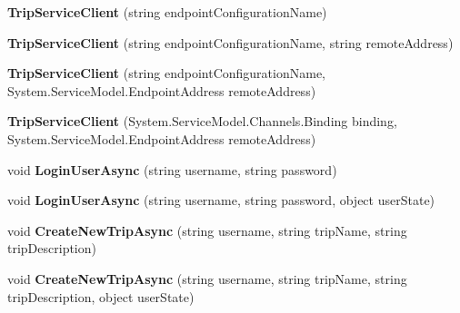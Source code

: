 \begin{DoxyCompactItemize}
\item 
\hypertarget{class_trip_service_client_a00bff7b4e57709fa66367f838cc62003}{
{\bfseries TripServiceClient} (string endpointConfigurationName)}
\label{class_trip_service_client_a00bff7b4e57709fa66367f838cc62003}

\item 
\hypertarget{class_trip_service_client_ab4a2663da378c9b53d77ae14cb527579}{
{\bfseries TripServiceClient} (string endpointConfigurationName, string remoteAddress)}
\label{class_trip_service_client_ab4a2663da378c9b53d77ae14cb527579}

\item 
\hypertarget{class_trip_service_client_a14810eca7652c4f20b773d6f6ee80b4b}{
{\bfseries TripServiceClient} (string endpointConfigurationName, System.ServiceModel.EndpointAddress remoteAddress)}
\label{class_trip_service_client_a14810eca7652c4f20b773d6f6ee80b4b}

\item 
\hypertarget{class_trip_service_client_a74f3aec249adc60fef595b722d37599c}{
{\bfseries TripServiceClient} (System.ServiceModel.Channels.Binding binding, System.ServiceModel.EndpointAddress remoteAddress)}
\label{class_trip_service_client_a74f3aec249adc60fef595b722d37599c}

\item 
\hypertarget{class_trip_service_client_a5647c3d8d6c56a8391e1c6a08e52b8bf}{
void {\bfseries LoginUserAsync} (string username, string password)}
\label{class_trip_service_client_a5647c3d8d6c56a8391e1c6a08e52b8bf}

\item 
\hypertarget{class_trip_service_client_ae42142a56684ab94bfdd62504067eaa2}{
void {\bfseries LoginUserAsync} (string username, string password, object userState)}
\label{class_trip_service_client_ae42142a56684ab94bfdd62504067eaa2}

\item 
\hypertarget{class_trip_service_client_ad066d796a79b884da4809c6895205709}{
void {\bfseries CreateNewTripAsync} (string username, string tripName, string tripDescription)}
\label{class_trip_service_client_ad066d796a79b884da4809c6895205709}

\item 
\hypertarget{class_trip_service_client_a826bd31109eded9a545c98aaa2e787e5}{
void {\bfseries CreateNewTripAsync} (string username, string tripName, string tripDescription, object userState)}
\label{class_trip_service_client_a826bd31109eded9a545c98aaa2e787e5}


\end{DoxyCompactItemize}

